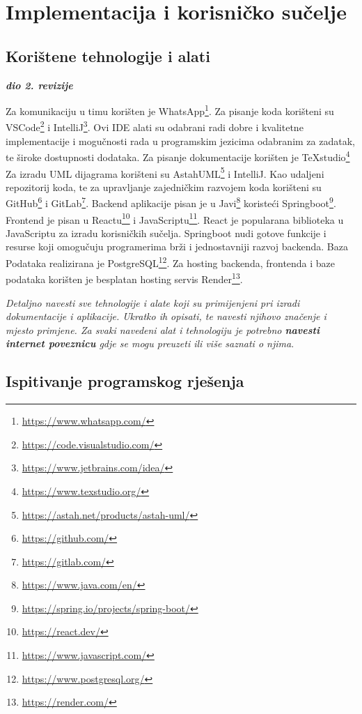 \chapter{Implementacija i korisničko sučelje}
		
		
		\section{Korištene tehnologije i alati}
		
			\textbf{\textit{dio 2. revizije}}
			
			Za komunikaciju u timu korišten je WhatsApp\footnote{\url{https://www.whatsapp.com/}}. Za pisanje koda korišteni su VSCode\footnote{\url{https://code.visualstudio.com/}} i IntelliJ\footnote{\url{https://www.jetbrains.com/idea/}}. Ovi IDE alati su odabrani radi dobre i kvalitetne implementacije i mogučnosti rada u programskim jezicima odabranim za zadatak, te široke dostupnosti dodataka. Za pisanje dokumentacije korišten je TeXstudio\footnote{\url{https://www.texstudio.org/}} Za izradu UML dijagrama korišteni su AstahUML\footnote{\url{https://astah.net/products/astah-uml/}} i IntelliJ.
			Kao udaljeni repozitorij koda, te za upravljanje zajedničkim razvojem koda korišteni su GitHub\footnote{\url{https://github.com/}} i GitLab\footnote{\url{https://gitlab.com/}}.
			Backend aplikacije pisan je u Javi\footnote{\url{https://www.java.com/en/}} koristeći Springboot\footnote{\url{https://spring.io/projects/spring-boot/}}. Frontend je pisan u Reactu\footnote{\url{https://react.dev/}} i JavaScriptu\footnote{\url{https://www.javascript.com/}}. React je popularana biblioteka u JavaScriptu za izradu korisničkih sučelja. Springboot nudi gotove funkcije i resurse koji omogučuju programerima brži i jednostavniji razvoj backenda.
			Baza Podataka realizirana je PostgreSQL\footnote{\url{https://www.postgresql.org/}}. Za hosting backenda, frontenda i baze podataka korišten je besplatan hosting servis Render\footnote{\url{https://render.com/}}.

			\textit{Detaljno navesti sve tehnologije i alate koji su primijenjeni pri izradi dokumentacije i aplikacije. Ukratko ih opisati, te navesti njihovo značenje i mjesto primjene. Za svaki navedeni alat i tehnologiju je potrebno \textbf{navesti internet poveznicu} gdje se mogu preuzeti ili više saznati o njima}.
			
			\eject 
		
	
		\section{Ispitivanje programskog rješenja}
			
